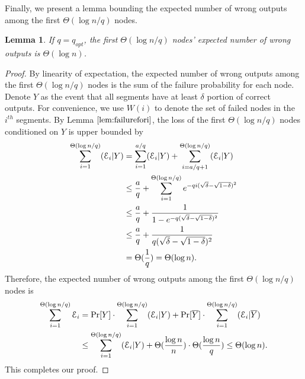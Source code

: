 \documentclass[a4paper,UKenglish]{lipics}
\newtheorem{lem}[thm]{Lemma}
\theoremstyle{definition}
\begin{document}
Finally, we present a lemma bounding the expected number of wrong outputs among the first $\Theta(\log n / q)$ nodes.

\begin{lem}
If $q = q_{opt}$, the first $\Theta(\log n/q)$ nodes' expected number of wrong outputs is $\Theta(\log n)$.
\end{lem}

\begin{proof}
By linearity of expectation, the expected number of wrong outputs among the first $\Theta(\log n/q)$ nodes 
	is the sum of the failure probability for each node. 
Denote $Y$ as the event that all segments have at least $\delta$ portion of correct outputs.
For convenience, we use $W(i)$ to denote the set of failed nodes in the $i^{th}$ segments.
By Lemma $\ref{lem:failurefori}$, the loss of the first $\Theta(\log n/q)$ nodes conditioned on $Y$ is upper bounded by
\begin{align*}
	\sum_{i=1}^{\Theta(\log n/q)} (\mathcal{E}_i|Y)
& =
	\sum_{i=1}^{a/q} (\mathcal{E}_i|Y) + \sum_{i=a/q+1}^{\Theta(\log n/q)} (\mathcal{E}_i|Y) \\
& \le
	{a \over q} + \sum_{i=1}^{\Theta(\log n/q)} e^{-qi(\sqrt{\delta} - \sqrt{1 - \delta})^2} \\
& \le
	{a \over q} + { 1 \over 1 - e^{-q(\sqrt{\delta} - \sqrt{1 - \delta})^2} } \\
& \le
	{a \over q} + {1 \over q(\sqrt{\delta} - \sqrt{1 - \delta})^2 } \\
& =
	\Theta ({1\over q})
	=
	\Theta(\log n).
\end{align*}
Therefore, the expected number of wrong outputs among the first $\Theta(\log n/q)$ nodes is
\begin{align*}
	\sum_{i=1}^{\Theta(\log n/q)} \mathcal{E}_i
& =
	\Pr[Y]\cdot \sum_{i=1}^{\Theta(\log n/q)} (\mathcal{E}_i|Y) + \Pr[\overline Y]\cdot \sum_{i=1}^{\Theta(\log n/q)} (\mathcal{E}_i|\overline Y) \\
& \le
	\sum_{i=1}^{\Theta(\log n/q)} (\mathcal{E}_i|Y) +  \Theta({\log n \over n})\cdot \Theta({\log n \over q})
	\le
	\Theta(\log n).
\end{align*}
This completes our proof.
\end{proof}
\end{document}
